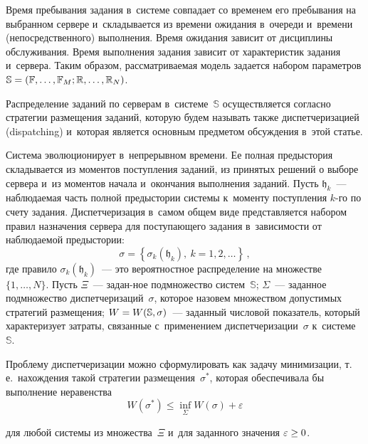 \begin{multicols}{2}
    Время пребывания задания в~системе совпадает со временем его пребывания на 
выбранном сер\-вере и~складывается из времени ожидания в~очереди и~времени 
(непосредственного) выполнения. \mbox{Время} ожидания зависит от дисциплины обслуживания. 
Время выполнения задания зависит от характеристик задания и~сервера. Таким образом, 
рассматриваемая модель задается набором пара\-мет\-ров $\mathbb{S}\hm= 
(\mathbb{F},\ldots,\mathbb{F}_M;\mathbb{R},\ldots , \mathbb{R}_N)$.
    
    Распределение заданий по серверам в~системе~$\mathbb{S}$ осуществляется согласно 
стратегии размещения заданий, которую будем называть также диспетчеризацией 
(dispatching) и~которая является основным предметом обсуждения в~этой статье.
    
    Система эволюционирует в~непрерывном времени. Ее полная предыстория 
складывается из моментов поступления заданий, из принятых решений о выборе сервера 
и~из моментов начала и~окончания выполнения заданий. Пусть $\mathfrak{h}_k$~--- 
наблюдаемая часть полной предыстории системы к~моменту поступления $k$-го по счету 
задания. Диспетчеризация в~самом общем виде представляется набором правил 
назначения сервера для по\-сту\-па\-юще\-го задания в~зависимости от наблюдаемой 
предыс\-тории:
    $$
    \sigma=\left\{ \sigma_k(\mathfrak{h}_k),\ k=1,2,\ldots\right\}\,,
    $$
где правило $\sigma_k(\mathfrak{h}_k)$~--- это вероятностное распределение на 
множестве $\{1,\ldots, N\}$. Пусть $\Xi$~---  задан-\linebreak ное подмножество 
систем~$\mathbb{S}$;
    $\Sigma$~--- заданное подмножество диспетчеризаций~$\sigma$, которое назовем 
множест\-вом допустимых стратегий размещения;
    $W\hm= W(\mathbb{S},\sigma)$~--- заданный числовой показатель, который 
характеризует затраты, связанные с~применением диспетчеризации~$\sigma$ 
к~системе~$\mathbb{S}$.
    
    Проблему диспетчеризации можно сформулировать как задачу минимизации, т.\,е.\ 
нахождения такой стратегии размещения~$\sigma^*$, которая обеспечивала бы 
выполнение неравенства
    $$
    W(\sigma^*) \leq \mathop{\mathrm{inf}}\limits_\Sigma W(\sigma)+\varepsilon
    $$
    
    
    \noindent
 для любой системы из множества~$\Xi$ и~для заданного значения  $\varepsilon\hm\geq 0$.
    

\end{multicols}
